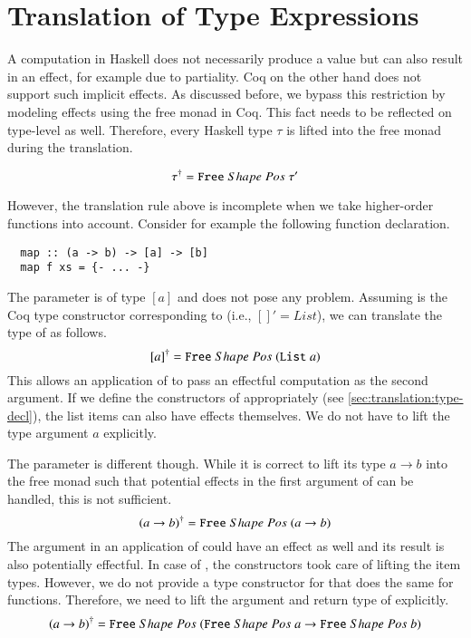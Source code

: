 \section{Translation of Type Expressions} \label{sec:translation:type}
A computation in Haskell does not necessarily produce a value but can also result in an effect, for example due to partiality.
Coq on the other hand does not support such implicit effects.
As discussed before, we bypass this restriction by modeling effects using the free monad in Coq.
This fact needs to be reflected on type-level as well.
Therefore, every Haskell type $\tau$ is lifted into the free monad during the translation.

\[
  {\tau}^{\dagger} = {\texttt{Free}}\;Shape\;Pos\;{\tau'}
\]

However, the translation rule above is incomplete when we take higher-order functions into account.
Consider for example the following function declaration.
\begin{verbatim}
  map :: (a -> b) -> [a] -> [b]
  map f xs = {- ... -}
\end{verbatim}

The parameter  is of type $[a]$ and does not pose any problem.
Assuming  is the Coq type constructor corresponding to \haskell{[]} (i.e., $[]' = List$), we can translate the type of  as follows.
\[
  {[a]}^{\dagger} = {\texttt{Free}}\;Shape\;Pos\;{(\texttt{List}\;a)}
\]
This allows an application of  to pass an effectful computation as the second argument.
If we define the constructors of  appropriately (see \autoref{sec:translation:type-decl}), the list items can also have effects themselves.
We do not have to lift the type argument $a$ explicitly.

The parameter  is different though.
While it is correct to lift its type $a \rightarrow b$ into the free monad such that potential effects in the first argument of  can be handled, this is not sufficient.
\[
  {(a \rightarrow b)}^{\dagger} = {\texttt{Free}}\;Shape\;Pos\;{(a \rightarrow b)}
\]
The argument in an application of  could have an effect as well and its result is also potentially effectful.
In case of , the  constructors took care of lifting the item types.
However, we do not provide a type constructor for \coq{->} that does the same for functions.
Therefore, we need to lift the argument and return type of  explicitly.
\[
  {(a \rightarrow b)}^{\dagger} = {\texttt{Free}}\;Shape\;Pos\;{({\texttt{Free}}\;Shape\;Pos\;{a} \rightarrow {\texttt{Free}}\;Shape\;Pos\;{b})}
\]

